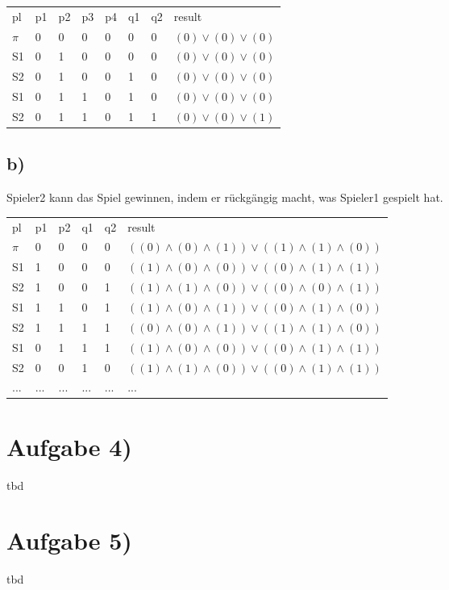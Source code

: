 \documentclass[12pt]{article}
\begin{document}
\begin{table}
\centering
\begin{tabular}{llllllll}
pl    & p1 & p2 & p3 & p4 & q1 & q2 &  result  \\
$\pi$ &0    &0    &0    &0    &0    &0    &$(0)\vee(0) \vee(0)$         \\
S1	  &0    &1    &0    &0    &0    &0    &$(0)\vee(0) \vee(0)$         \\
S2	  &0    &1    &0    &0    &1    &0    &$(0)\vee(0) \vee(0)$         \\
S1	  &0    &1    &1    &0    &1    &0    &$(0)\vee(0) \vee(0)$         \\
S2	  &0    &1    &1    &0    &1    &1    &$(0)\vee(0) \vee(1)$         \\    
\end{tabular}
\end{table}

\subsection*{b)}
Spieler2 kann das Spiel gewinnen, indem er rückgängig macht, was Spieler1 gespielt hat.\\

\begin{table}
\centering
\begin{tabular}{llllll}
pl & 	p1 & p2 & q1 & q2 & result  \\
$\pi$   &0    &0    &0    &0    & $((0)\wedge(0)\wedge(1) ) \vee  ( (1)\wedge(1)\wedge(0) ) $         \\
S1   &1    &0    &0    &0    & $((1)\wedge(0)\wedge(0) ) \vee  ( (0)\wedge(1)\wedge(1) ) $         \\
S2   &1    &0    &0    &1    & $((1)\wedge(1)\wedge(0) ) \vee  ( (0)\wedge(0)\wedge(1) ) $         \\
S1   &1    &1    &0    &1    & $((1)\wedge(0)\wedge(1) ) \vee  ( (0)\wedge(1)\wedge(0) ) $         \\
S2   &1    &1    &1    &1    & $((0)\wedge(0)\wedge(1) ) \vee  ( (1)\wedge(1)\wedge(0) ) $         \\
S1   &0    &1    &1    &1    & $((1)\wedge(0)\wedge(0) ) \vee  ( (0)\wedge(1)\wedge(1) ) $         \\
S2   &0    &0    &1    &0    & $((1)\wedge(1)\wedge(0) ) \vee  ( (0)\wedge(1)\wedge(1) ) $         \\
 ...  &  ...  &  ...  &  ...  & ...   &        ...
\end{tabular}
\end{table}



\section*{Aufgabe 4)}
tbd

\section*{Aufgabe 5)}
tbd
\end{document}

